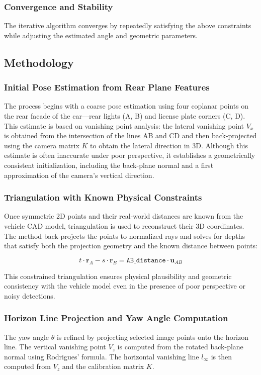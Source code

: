 \subsubsection{Convergence and Stability}
The iterative algorithm converges by repeatedly satisfying the above constraints while adjusting the estimated angle and geometric parameters.

\subsection{Methodology}
\subsubsection{Initial Pose Estimation from Rear Plane Features}
The process begins with a coarse pose estimation using four coplanar points on the rear facade of the car—rear lights (A, B) and license plate corners (C, D). This estimate is based on vanishing point analysis: the lateral vanishing point $V_x$ is obtained from the intersection of the lines AB and CD and then back-projected using the camera matrix $K$ to obtain the lateral direction in 3D. Although this estimate is often inaccurate under poor perspective, it establishes a geometrically consistent initialization, including the back-plane normal and a first approximation of the camera’s vertical direction.

\subsubsection{Triangulation with Known Physical Constraints}
Once symmetric 2D points and their real-world distances are known from the vehicle CAD model, triangulation is used to reconstruct their 3D coordinates. The method back-projects the points to normalized rays and solves for depths that satisfy both the projection geometry and the known distance between points:

\begin{equation}
    t \cdot \mathbf{r}_A - s \cdot \mathbf{r}_B = \texttt{AB\_distance} \cdot \mathbf{u}_{AB}
\end{equation}

This constrained triangulation ensures physical plausibility and geometric consistency with the vehicle model even in the presence of poor perspective or noisy detections.

\subsubsection{Horizon Line Projection and Yaw Angle Computation}
The yaw angle $\theta$ is refined by projecting selected image points onto the horizon line. The vertical vanishing point $V_z$ is computed from the rotated back-plane normal using Rodrigues' formula. The horizontal vanishing line $l_\infty$ is then computed from $V_z$ and the calibration matrix $K$.

